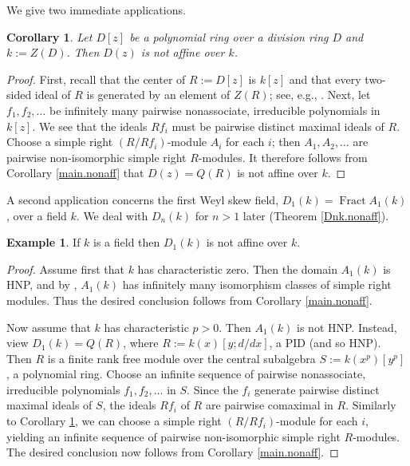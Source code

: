 \documentclass{conm-p-l}
\newtheorem{cor}[theorem]{Corollary}
\theoremstyle{definition}
\newtheorem{exam}[theorem]{Example}
\theoremstyle{remark}
\numberwithin{equation}{section}
\DeclareMathOperator \Fract { {\mathrm{Fract}} }
\begin{document}
We give two immediate applications. 

\begin{cor}  \label{D(z).nonaff} 
Let $D[z]$ be a polynomial ring over a division ring $D$ and $k := Z(D)$.  Then $D(z)$ is not affine over $k$.
\end{cor}

\begin{proof}
First, recall that the center of $R := D[z]$ is $k[z]$ and that every two-sided ideal of $R$ is generated by an element of $Z(R)$; see, e.g., \cite[Proposition 17.1]{Goo-War}. Next, let $f_1,f_2, \dots$ be infinitely many pairwise nonassociate, irreducible polynomials in $k[z]$. We see that the ideals $Rf_i$ must be pairwise distinct maximal ideals of $R$.  Choose a simple right $(R/Rf_i)$-module $A_i$ for each $i$; then $A_1,A_2,\dots$ are pairwise non-isomorphic simple right $R$-modules.  It therefore follows from Corollary \ref{main.nonaff} that $D(z) = Q(R)$ is not affine over $k$.
\end{proof}

A second application concerns the first Weyl skew field, $D_1(k) = \Fract A_1(k)$, over a field $k$. We deal with $D_n(k)$ for $n>1$ later (Theorem \ref{Dnk.nonaff}).

\begin{exam}  \label{D1k.nonaff}
If $k$ is a field then $D_1(k)$ is not affine over $k$.
\end{exam} 

\begin{proof} 
Assume first that $k$ has characteristic zero. Then the domain $A_1(k)$ is HNP, and by \cite[Proposition 5.6]{McR73}, $A_1(k)$ has infinitely many isomorphism classes of simple right modules. Thus the desired conclusion follows from Corollary \ref{main.nonaff}.

Now assume that $k$ has characteristic $p>0$.  Then $A_1(k)$ is not HNP.  Instead, view $D_1(k) = Q(R)$, where $R := k(x)[y;d/dx]$, a PID (and so HNP). Then $R$ is a finite rank free module over the central subalgebra $S := k(x^p)[y^p]$, a polynomial ring. Choose an infinite sequence of pairwise nonassociate, irreducible polynomials $f_1,f_2,\dots$ in $S$. Since the $f_i$ generate pairwise distinct maximal ideals of $S$, the ideals $Rf_i$ of $R$ are pairwise comaximal in $R$. Similarly to Corollary \ref{D(z).nonaff}, we can choose a simple right $(R/Rf_i)$-module for each $i$, yielding an infinite sequence of pairwise non-isomorphic simple right $R$-modules. The desired conclusion now follows from Corollary \ref{main.nonaff}.
\end{proof}
\end{document}
